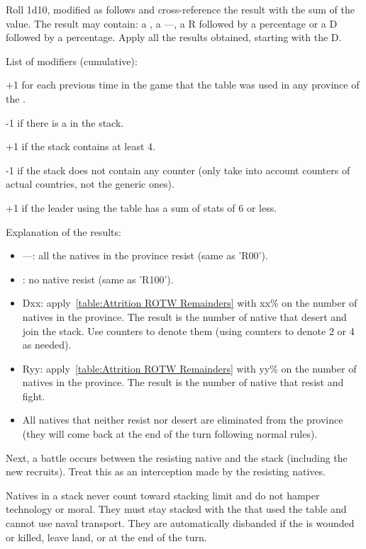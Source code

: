 Roll 1d10, modified as follows and cross-reference the result with the sum of
the \LeaderC value. The result may contain: a \textdag, a ---, a R followed by
a percentage or a D followed by a percentage. Apply all the results obtained,
starting with the D.

List of modifiers (cumulative):
\begin{modlist}
\item[+1] for each previous time in the game that the table was used in any
  province of the \Area.
\item[-1] if there is a \LeaderMis in the stack.
\item[+1] if the stack contains at least 4\LD.
\item[-1] if the stack does not contain any \ARMY counter (only take into
  account counters of actual countries, not the generic  ones).
\item[+1] if the leader using the table has a sum of stats of 6 or less.
\end{modlist}

Explanation of the results:
\begin{itemize}
\item ---: all the natives in the province resist (same as 'R00').
\item \textdag: no native resist (same as 'R100').
\item Dxx: apply~\ref{table:Attrition ROTW Remainders} with xx\% on the
  number of natives in the province. The result is the number of native \LD
  that desert and join the stack. Use  counters to denote them
  (using \ARMY counters to denote 2 or 4 \LD as needed).
\item Ryy: apply~\ref{table:Attrition ROTW Remainders} with yy\% on the
  number of natives in the province. The result is the number of native \LD
  that resist and fight.
\item All natives that neither resist nor desert are eliminated from the
  province (they will come back at the end of the turn following normal
  rules).
\end{itemize}

Next, a battle occurs between the resisting native and the stack (including
the new recruits). Treat this as an interception made by the resisting
natives.

Natives in a stack never count toward stacking limit and do not hamper
technology or moral. They must stay stacked with the \LeaderC that used the
table and cannot use naval transport. They are automatically disbanded if the
\LeaderC is wounded or killed, leave land, or at the end of the turn.

